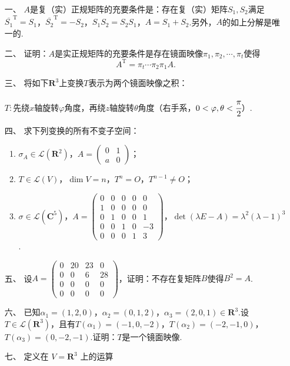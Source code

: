 \begin{enumerate}
	\item[一、]$A$是复（实）正规矩阵的充要条件是：存在复（实）矩阵$S_1,S_2$满足$\overline{S_1}^{\mathrm{T}}=S_1$，$\overline{S_2}^{\mathrm{T}}=-S_2$，$S_1S_2=S_2S_1$，$A=S_1+S_2$.另外，$A$的如上分解是唯一的.
	\item[二、]证明：$A$是实正规矩阵的充要条件是存在镜面映像$\pi_1,\pi_2,\cdots,\pi_t$使得
    \[A^\mathrm{T}=\pi_t\cdots\pi_2\pi_1A.\]
	\item[三、]将如下$\mathbf{R}^3$上变换$T$表示为两个镜面映像之积：

    $T:$先绕$x$轴旋转$\varphi$角度，再绕$z$轴旋转$\theta$角度（右手系，$0<\varphi,\theta<\cfrac{\pi}{2}$）.
	\item[四、]求下列变换的所有不变子空间：
	\begin{enumerate}[label=(\arabic*)]
        \item $\sigma_A\in\mathcal{L}(\mathbf{R}^2)$，$A=\begin{pmatrix}
            0 & 1 \\ a & 0
        \end{pmatrix}$；
        \item $T\in\mathcal{L}(V)$，$\dim V=n$，$T^n=O$，$T^{n-1}\neq O$；
        \item $\sigma\in\mathcal{L}(\mathbf{C}^5)$，$A=\begin{pmatrix}
            0 & 0 & 0 & 0 & 0 \\ 1 & 0 & 0 & 0 & 0 \\ 0 & 1 & 0 & 0 & 1 \\ 0 & 0 & 1 & 0 & -3 \\ 0 & 0 & 0 & 1 & 3
        \end{pmatrix}$，$\det(\lambda E-A)=\lambda^2(\lambda-1)^3$.
    \end{enumerate}
	\item[五、]设$A=\begin{pmatrix}
        0 & 20 & 23 & 0 \\ 0 & 0 & 6 & 28 \\ 0 & 0 & 0 & 0 \\ 0 & 0 & 0 & 0
    \end{pmatrix}$，证明：不存在复矩阵$B$使得$B^2=A$.
	\item[六、]已知$\alpha_1=(1,2,0)$，$\alpha_2=(0,1,2)$，$\alpha_3=(2,0,1)\in\mathbf{R}^3$.设$T\in\mathcal{L}(\mathbf{R}^3)$，且有$T(\alpha_1)=(-1,0,-2)$，$T(\alpha_2)=(-2,-1,0)$，$T(\alpha_3)=(0,-2,-1)$.证明：$T$是一个镜面映像.
    \item[七、]定义在 $ V = \mathbf{R}^3 $ 上的运算

\end{enumerate}

